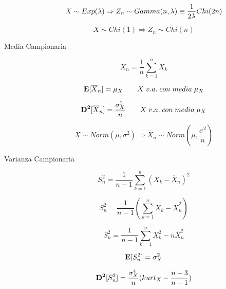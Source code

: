 \begin{description}
		\begin{equation}
		X \sim Exp(\lambda) \Rightarrow Z_{n} \sim Gamma(n, \lambda) \equiv \frac{1}{2\lambda}Chi(2n)\\
		\end{equation}
		
		\begin{equation}
		X \sim Chi(1) \Rightarrow Z_{n} \sim Chi(n)
		\end{equation}
	
	\item[Media Campionaria]
		\begin{equation}
		\overline{X}_{n} = \frac{1}{n}\sum_{k=1}^{n} X_{k}
		\end{equation}
		
		\begin{equation}
		\mathbf{E}[\overline{X}_{n}] = \mu_{X} \qquad X \; v.a. \; con \; media \; \mu_{X}
		\end{equation}
		
		\begin{equation}
		\mathbf{D^{2}}[\overline{X}_{n}] = \frac{\sigma_{X}^{2}}{n} \qquad X \; v.a. \; con \; media \; \mu_{X}
		\end{equation}
		
		\begin{equation}
		X \sim Norm(\mu,\sigma^{2}) \Rightarrow \overline{X}_{n} \sim Norm(\mu,\frac{\sigma^{2}}{n})
		\end{equation}
	
	\item[Varianza Campionaria]
		\begin{equation}
		S_{n}^{2} = \frac{1}{n-1}\sum_{k=1}^{n} (X_{k}-\overline{X}_{n})^{2}
		\end{equation}
		
		\begin{equation}
		S_{n}^{2} = \frac{1}{n-1}(\sum_{k=1}^{n} X_{k}-\overline{X}_{n}^{2})
		\end{equation}
		
		\begin{equation}
		S_{n}^{2} = \frac{1}{n-1}\sum_{k=1}^{n}X_{k}^{2}-n\overline{X}_{n}^{2}
		\end{equation}
		
		\begin{equation}
		\mathbf{E}[S_{n}^{2}] = \sigma_{X}^{2}
		\end{equation}
		
		\begin{equation}
		\mathbf{D^{2}}[S_{n}^{2}] = \frac{\sigma_{X}^{4}}{n}(kurt_{X}-\frac{n-3}{n-1})
		\end{equation}
	

\end{description}

